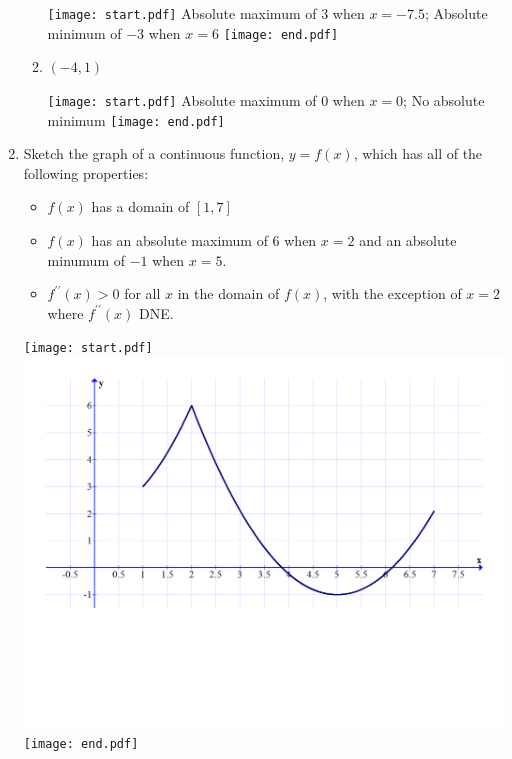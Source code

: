 \documentclass[12pt]{article}
\begin{document}
\begin{enumerate}
\begin{enumerate}
\texttt{[image: start.pdf]}
{{Absolute maximum of $3$ when $x=-7.5$; Absolute minimum of $-3$ when $x=6$}}
\texttt{[image: end.pdf]}


\item $(-4,1)$

\texttt{[image: start.pdf]}
{{Absolute maximum of 0 when $x=0$; No absolute minimum}}
\texttt{[image: end.pdf]}


\end{enumerate}

\newpage

\item Sketch the graph of a continuous function, $y=f(x)$, which has all of the following properties:

\begin{itemize}

\item $f(x)$ has a domain of $[1,7]$

\item $f(x)$ has an absolute maximum of 6 when $x=2$ and an absolute minumum of $-1$ when $x=5$.

\item $f^{\prime \prime}(x)>0$ for all $x$ in the domain of $f(x)$, with the exception of $x=2$ where $f^{\prime \prime}(x)$ DNE.

\end{itemize}

\texttt{[image: start.pdf]}
{{\includegraphics[scale=0.3]{graph2.pdf}}}
\texttt{[image: end.pdf]}


\end{enumerate}
\end{document}
